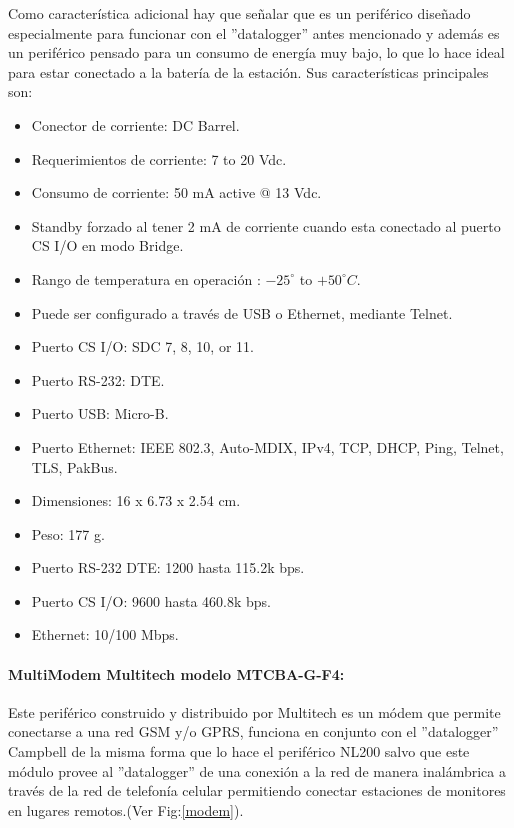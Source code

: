 Como característica adicional hay que señalar que es un periférico diseñado especialmente para funcionar con el ''datalogger'' antes mencionado y además es un periférico pensado para un consumo de energía muy bajo, lo que lo hace ideal para estar conectado a la batería de la estación. Sus características principales son:

\begin{itemize}
\item Conector de corriente: DC Barrel.
\item Requerimientos de corriente: 7 to 20 Vdc. 
\item Consumo de corriente: 50 mA active @ 13 Vdc.
\item Standby forzado al tener 2 mA de corriente cuando esta conectado al puerto CS I/O en modo Bridge.
\item Rango de temperatura en operación : ${-25}^{\circ}$ to ${+50}^{\circ}C$.
\item Puede ser configurado a través de USB o Ethernet, mediante Telnet.
\item Puerto CS I/O: SDC 7, 8, 10, or 11.
\item Puerto RS-232: DTE.
\item Puerto USB: Micro-B.
\item Puerto Ethernet: IEEE 802.3, Auto-MDIX, IPv4, TCP, DHCP, Ping, Telnet, TLS, PakBus.
\item Dimensiones: 16 x 6.73 x 2.54 cm.
\item Peso: 177 g.
\item Puerto RS-232 DTE: 1200 hasta 115.2k bps.
\item Puerto CS I/O: 9600 hasta 460.8k bps.
\item Ethernet: 10/100 Mbps.
\end{itemize}

\paragraph{MultiModem Multitech modelo MTCBA-G-F4:}
Este periférico construido y distribuido por Multitech\cite{hardware:multitech} es un módem que permite conectarse a una red GSM y/o GPRS, funciona en conjunto con el ''datalogger'' Campbell de la misma forma que lo hace el periférico NL200 salvo que este módulo provee al ''datalogger'' de una conexión a la red de manera inalámbrica a través de la red de telefonía celular permitiendo conectar estaciones de monitores en lugares remotos.(Ver Fig:\ref{modem}).\\

